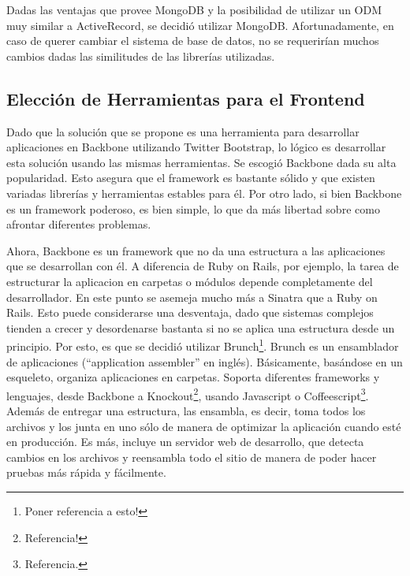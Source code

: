 \documentclass[12pt,titlepage,]{article}
\begin{document}
Dadas las ventajas que provee MongoDB y la posibilidad de utilizar un
ODM muy similar a ActiveRecord, se decidió utilizar MongoDB.
Afortunadamente, en caso de querer cambiar el sistema de base de datos,
no se requerirían muchos cambios dadas las similitudes de las librerías
utilizadas.

\subsection{Elección de Herramientas para el Frontend}

Dado que la solución que se propone es una herramienta para desarrollar
aplicaciones en Backbone utilizando Twitter Bootstrap, lo lógico es
desarrollar esta solución usando las mismas herramientas. Se escogió
Backbone dada su alta popularidad. Esto asegura que el framework es
bastante sólido y que existen variadas librerías y herramientas estables
para él. Por otro lado, si bien Backbone es un framework poderoso, es
bien simple, lo que da más libertad sobre como afrontar diferentes
problemas.

Ahora, Backbone es un framework que no da una estructura a las
aplicaciones que se desarrollan con él. A diferencia de Ruby on Rails,
por ejemplo, la tarea de estructurar la aplicacion en carpetas o módulos
depende completamente del desarrollador. En este punto se asemeja mucho
más a Sinatra que a Ruby on Rails. Esto puede considerarse una
desventaja, dado que sistemas complejos tienden a crecer y desordenarse
bastanta si no se aplica una estructura desde un principio. Por esto, es
que se decidió utilizar Brunch\footnote{Poner referencia a esto!}.
Brunch es un ensamblador de aplicaciones (``application assembler'' en
inglés). Básicamente, basándose en un esqueleto, organiza aplicaciones
en carpetas. Soporta diferentes frameworks y lenguajes, desde Backbone a
Knockout\footnote{Referencia!}, usando Javascript o
Coffeescript\footnote{Referencia.}. Además de entregar una estructura,
las ensambla, es decir, toma todos los archivos y los junta en uno sólo
de manera de optimizar la aplicación cuando esté en producción. Es más,
incluye un servidor web de desarrollo, que detecta cambios en los
archivos y reensambla todo el sitio de manera de poder hacer pruebas más
rápida y fácilmente.
\end{document}
